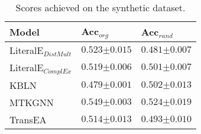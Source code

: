 
\begin{table}[]

\setlength{\tabcolsep}{6pt}
\renewcommand{\arraystretch}{1.1}

\caption{Scores achieved on the synthetic dataset.}
\label{tab:synthetic}
\begin{center}

\begin{tabular}{l|l|l}
\hline
Model & Acc$_{org}$                            &  Acc$_{rand}$                            \\ \hline
LiteralE$_{DistMult}$ & $0.523 {\scriptstyle \pm 0.015}$ & $0.481 {\scriptstyle \pm 0.007}$\\ 
LiteralE$_{ComplEx}$ & $0.519 {\scriptstyle \pm 0.006}$ & $0.501 {\scriptstyle \pm 0.007}$\\ 
KBLN & $0.479 {\scriptstyle \pm 0.001}$ & $0.502 {\scriptstyle \pm 0.013}$\\ 
MTKGNN & $0.549 {\scriptstyle \pm 0.003}$ & $0.524 {\scriptstyle \pm 0.019}$\\ 
TransEA & $0.514 {\scriptstyle \pm 0.013}$ & $0.493 {\scriptstyle \pm 0.010}$\\ 

\hline
\end{tabular}

\end{center}
\end{table}
